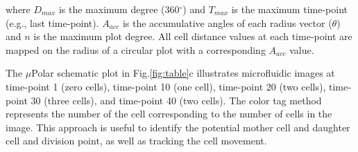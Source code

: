 \documentclass[conference]{IEEEtran}
\begin{document}
\noindent where $ D_{max} $ is the maximum degree (360$^{\circ}$) and  $ T_{max} $ is the maximum time-point (e.g., last time-point). $ A_{acc} $ is the accumulative angles of each radius vector ($\theta$) and $ n $ is the maximum plot degree. All cell distance values at each time-point are mapped on the radius of a circular plot with a corresponding $A_{acc}$ value.

The $\mu$Polar schematic plot in Fig.\ref{fig:table}c illustrates microfluidic images at time-point 1 (zero cells), time-point 10 (one cell), time-point 20 (two cells), time-point 30 (three cells), and time-point 40 (two cells). The color tag method represents the number of the cell corresponding to the number of cells in the image. This approach is useful to identify the potential mother cell and daughter cell and division point, as well as tracking the cell movement. 



 
 
 
 
 
\end{document}
